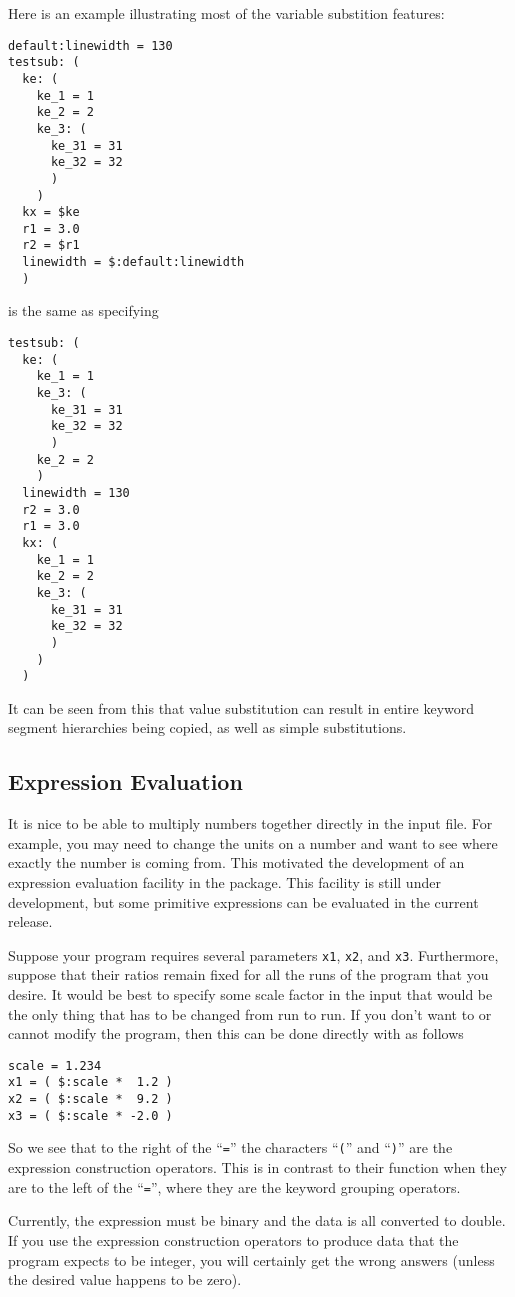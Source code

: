 Here is an example illustrating most of the variable substition
features:
\begin{verbatim}
default:linewidth = 130
testsub: (
  ke: (
    ke_1 = 1
    ke_2 = 2
    ke_3: (
      ke_31 = 31
      ke_32 = 32
      )
    )
  kx = $ke
  r1 = 3.0
  r2 = $r1
  linewidth = $:default:linewidth
  )
\end{verbatim}
is the same as specifying
\begin{verbatim}
testsub: (
  ke: (
    ke_1 = 1
    ke_3: (
      ke_31 = 31
      ke_32 = 32
      )
    ke_2 = 2
    )
  linewidth = 130
  r2 = 3.0
  r1 = 3.0
  kx: (
    ke_1 = 1
    ke_2 = 2
    ke_3: (
      ke_31 = 31
      ke_32 = 32
      )
    )
  )
\end{verbatim}
It can be seen from this that value substitution can result in entire
keyword segment hierarchies being copied, as well as simple
substitutions.


\subsection{Expression Evaluation}

It is nice to be able to multiply numbers together directly in the input
file.  For example, you may need to change the units on a number and
want to see where exactly the number is coming from.  This motivated the
development of an expression evaluation facility in the
 package.  This facility is still under development,
but some primitive expressions can be evaluated in the current release.

Suppose your program requires several parameters \verb|x1|, \verb|x2|,
and \verb|x3|.  Furthermore, suppose that their ratios remain fixed for
all the runs of the program that you desire.  It would be best to
specify some scale factor in the input that would be the only thing that
has to be changed from run to run.  If you don't want to or cannot
modify the program, then this can be done directly with
 as follows
\begin{verbatim}
scale = 1.234
x1 = ( $:scale *  1.2 )
x2 = ( $:scale *  9.2 )
x3 = ( $:scale * -2.0 )
\end{verbatim}
So we see that to the right of the ``\verb|=|'' the characters
``\verb|(|'' and ``\verb|)|'' are the expression construction operators.
This is in contrast to their function when they are to the left of the
``\verb|=|'', where they are the keyword grouping operators.

Currently, the expression must be binary and the data is all converted
to double.  If you use the expression construction operators to produce
data that the program expects to be integer, you will certainly get the
wrong answers (unless the desired value happens to be zero).

